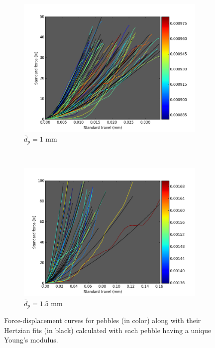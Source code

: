 \begin{figure}
        \centering
        \begin{subfigure}[b]{\imagewidth}
                \includegraphics[width=\textwidth]{chapters/figures/nfri-1mm-hertz-colormap.png}
                \caption{$\bar{d}_p = 1$ mm}
                \label{fig:nfri-1-exp-hertz}
        \end{subfigure}
        ~
        \begin{subfigure}[b]{\imagewidth}
                \includegraphics[width=\textwidth]{chapters/figures/nfri-1.5mm-hertz-colormap.png}
                \caption{$\bar{d}_p = 1.5$ mm}
                \label{fig:nfri-1.5-exp-hertz}
        \end{subfigure}
        \caption{Force-displacement curves for \lit pebbles (in color) along with their Hertzian fits (in black) calculated with each pebble having a unique Young's modulus.}\label{fig:nfri-exp-hertz}
\end{figure}

